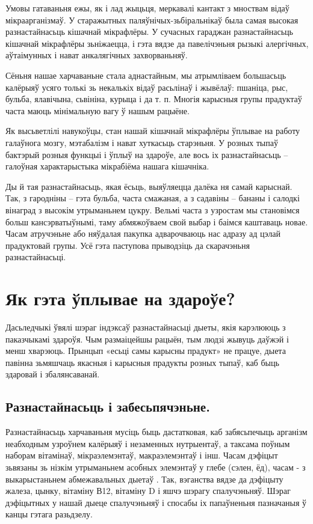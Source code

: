 Умовы гатаваньня ежы, як і лад жыцьця, меркавалі кантакт з мноствам відаў мікраарганізмаў. У старажытных паляўнічых-зьбіральнікаў была самая высокая разнастайнасьць кішачнай мікрафлёры. У сучасных гараджан разнастайнасьць кішачнай мікрафлёры зьніжаецца, і гэта вядзе да павелічэньня рызыкі алергічных, аўтаімунных і нават анкалягічных захворваньняў.

Сёньня нашае харчаваньне стала аднастайным, мы атрымліваем большасьць калёрыяў усяго толькі зь некалькіх відаў расьлінаў і жывёлаў: пшаніца, рыс, бульба, ялавічына, сьвініна, курыца і да т. п. Многія карысныя групы прадуктаў часта маюць мінімальную вагу ў нашым рацыёне.

Як высьветлілі навукоўцы, стан нашай кішачнай мікрафлёры ўплывае на работу галаўнога мозгу, мэтабалізм і нават хуткасьць старэньня. У розных тыпаў бактэрый розныя функцыі і ўплыў на здароўе, але вось іх разнастайнасьць – галоўная характарыстыка мікрабіёма нашага кішачніка.

Ды й тая разнастайнасьць, якая ёсьць, выяўляецца далёка ня самай карыснай. Так, з гародніны – гэта бульба, часта смажаная, а з садавіны – бананы і салодкі вінаград з высокім утрыманьнем цукру. Вельмі часта з узростам мы становімся больш кансэрватыўнымі, таму абмяжоўваем свой выбар і баімся каштаваць новае. Часам атручэньне або няўдалая пакупка адварочваюць нас адразу ад цэлай прадуктовай групы. Усё гэта паступова прыводзіць да скарачэньня разнастайнасьці.

\section{Як гэта ўплывае на здароўе?}

Дасьледчыкі ўвялі шэраг індэксаў разнастайнасьці дыеты, якія карэлююць з паказчыкамі здароўя. Чым размаіцейшы рацыён, тым людзі жывуць даўжэй і менш хварэюць. Прынцып «есьці самы карысны прадукт» не працуе, дыета павінна зьмяшчаць якасныя і карысныя прадукты розных тыпаў, каб быць здаровай і збалянсаванай.

\subsection{Разнастайнасьць і забесьпячэньне.}
Разнастайнасьць харчаваньня мусіць быць дастатковая, каб забясьпечыць арганізм неабходным узроўнем калёрыяў і незаменных нутрыентаў, а таксама поўным наборам вітамінаў, мікраэлемэнтаў, макраэлемэнтаў і інш. Часам дэфіцыт зьвязаны зь нізкім утрыманьнем асобных элемэнтаў у глебе (сэлен, ёд), часам - з выкарыстаньнем абмежавальных дыетаў . Так, вэганства вядзе да дэфіцыту жалеза, цынку, вітаміну В12, вітаміну D і яшчэ шэрагу спалучэньняў. Шэраг дэфіцытных у нашай дыеце спалучэньняў і спосабы іх папаўненьня пазначаныя ў канцы гэтага разьдзелу.

